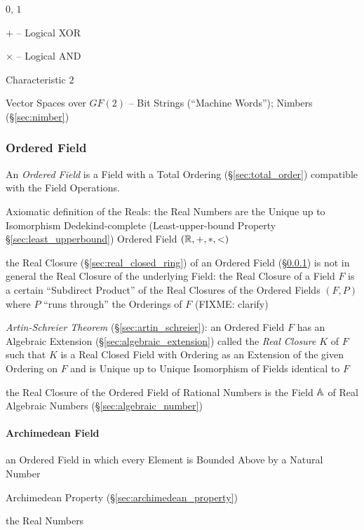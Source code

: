$0$, $1$

$+$ -- Logical XOR

$\times$ -- Logical AND

Characteristic $2$

Vector Spaces over $GF(2)$ -- Bit Strings (``Machine Words''); \fist Nimbers
(\S\ref{sec:nimber})



\subsubsection{Ordered Field}\label{sec:ordered_field}

An \emph{Ordered Field} is a Field with a Total Ordering
(\S\ref{sec:total_order}) compatible with the Field Operations.

Axiomatic definition of the Reals: the Real Numbers are the Unique up to
Isomorphism Dedekind-complete (Least-upper-bound Property
\S\ref{sec:least_upperbound}) Ordered Field $(\mathbb{R}, +, *, <)$

the Real Closure (\S\ref{sec:real_closed_ring}) of an Ordered Field
(\S\ref{sec:ordered_field}) is not in general the Real Closure of the
underlying Field: the Real Closure of a Field $F$ is a certain ``Subdirect
Product'' of the Real Closures of the Ordered Fields $(F,P)$ where $P$ ``runs
through'' the Orderings of $F$ (FIXME: clarify)

\emph{Artin-Schreier Theorem} (\S\ref{sec:artin_schreier}): an Ordered Field
$F$ has an Algebraic Extension (\S\ref{sec:algebraic_extension}) called the
\emph{Real Closure} $K$ of $F$ such that $K$ is a Real Closed Field with
Ordering as an Extension of the given Ordering on $F$ and is Unique up to
Unique Isomorphism of Fields identical to $F$

the Real Closure of the Ordered Field of Rational Numbers is the Field $\mathbb{A}$
of Real Algebraic Numbers (\S\ref{sec:algebraic_number})



\paragraph{Archimedean Field}\label{sec:archimedean_field}\hfill

an Ordered Field in which every Element is Bounded Above by a Natural Number

Archimedean Property (\S\ref{sec:archimedean_property})

the Real Numbers



